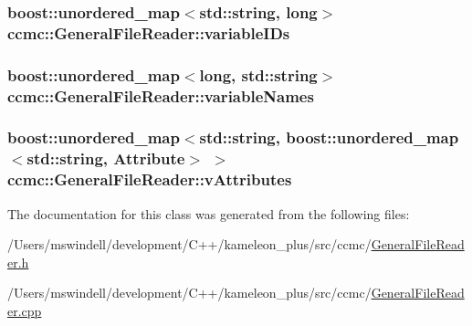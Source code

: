 \hypertarget{classccmc_1_1_general_file_reader_a70d799a29940fa982885ce8c0963942d}{
\subsubsection[{variable\-I\-Ds}]{\setlength{\rightskip}{0pt plus 5cm}boost\-::unordered\-\_\-map$<$std\-::string, long$>$ ccmc\-::\-General\-File\-Reader\-::variable\-I\-Ds\hspace{0.3cm}{\ttfamily [protected]}}}\label{classccmc_1_1_general_file_reader_a70d799a29940fa982885ce8c0963942d}
\hypertarget{classccmc_1_1_general_file_reader_aa3a4c9091feaec12035bcc981299de47}{
\subsubsection[{variable\-Names}]{\setlength{\rightskip}{0pt plus 5cm}boost\-::unordered\-\_\-map$<$long, std\-::string$>$ ccmc\-::\-General\-File\-Reader\-::variable\-Names\hspace{0.3cm}{\ttfamily [protected]}}}\label{classccmc_1_1_general_file_reader_aa3a4c9091feaec12035bcc981299de47}
\hypertarget{classccmc_1_1_general_file_reader_a806b25ba22db767f9f61ae578634ef08}{
\subsubsection[{v\-Attributes}]{\setlength{\rightskip}{0pt plus 5cm}boost\-::unordered\-\_\-map$<$std\-::string, boost\-::unordered\-\_\-map$<$std\-::string, {\bf Attribute}$>$ $>$ ccmc\-::\-General\-File\-Reader\-::v\-Attributes\hspace{0.3cm}{\ttfamily [protected]}}}\label{classccmc_1_1_general_file_reader_a806b25ba22db767f9f61ae578634ef08}


The documentation for this class was generated from the following files\-:\begin{DoxyCompactItemize}
\item 
/\-Users/mswindell/development/\-C++/kameleon\-\_\-plus/src/ccmc/\hyperlink{_general_file_reader_8h}{General\-File\-Reader.\-h}\item 
/\-Users/mswindell/development/\-C++/kameleon\-\_\-plus/src/ccmc/\hyperlink{_general_file_reader_8cpp}{General\-File\-Reader.\-cpp}\end{DoxyCompactItemize}
